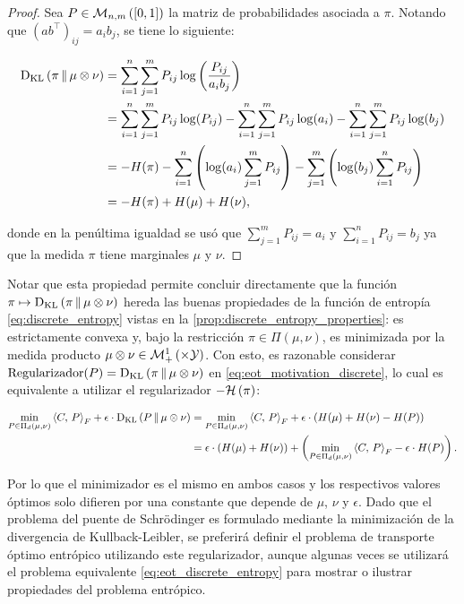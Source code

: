 \begin{proof}
	Sea $P\in\mathcal{M}_{n,m}\left([0,1]\right)$ la matriz de probabilidades asociada a $\pi$. Notando que $(ab^\top)_{ij} = a_i b_j$, se tiene lo siguiente:

	\begin{align*}
		\operatorname{D_{KL}}\left(\pi\,\|\,\mu\otimes\nu\right) & = \sum_{i=1}^n \sum_{j=1}^m P_{ij}\log\left(\frac{P_{ij}}{a_ib_j}\right)                                                                    \\
		                        & = \sum_{i=1}^n \sum_{j=1}^m P_{ij}\log(P_{ij}) - \sum_{i=1}^n \sum_{j=1}^m P_{ij}\log(a_i) - \sum_{i=1}^n \sum_{j=1}^m P_{ij} \log(b_j) \\
		                        & = -H(\pi) - \sum_{i=1}^n \left(\log(a_i)\sum_{j=1}^m P_{ij}\right) - \sum_{j=1}^m \left(\log(b_j) \sum_{i=1}^n P_{ij}\right)                    \\
		                        & = -H(\pi) + H(\mu) + H(\nu),
	\end{align*}

	donde en la penúltima igualdad se usó que $\sum_{j=1}^m P_{ij} = a_i$ y $\sum_{i=1}^n P_{ij} = b_j$ ya que la medida $\pi$ tiene marginales $\mu$ y $\nu$.
\end{proof}

Notar que esta propiedad permite concluir directamente que la función $\pi\mapsto\operatorname{D_{KL}}\left(\pi\,\|\,\mu\otimes\nu\right)$ hereda las buenas propiedades de la función de entropía \eqref{eq:discrete_entropy} vistas en la \autoref{prop:discrete_entropy_properties}: es estrictamente convexa y, bajo la restricción $\pi\in\Pi(\mu,\nu)$, es minimizada por la medida producto $\mu\otimes\nu\in\probmeasure{\xspace\times\yspace}$. Con esto, es razonable considerar $\text{Regularizador}(P)=\operatorname{D_{KL}}\left(\pi\,\|\,\mu\otimes\nu\right)$ en \eqref{eq:eot_motivation_discrete}, lo cual es equivalente a utilizar el regularizador $-\mathcal{H}\left(\pi\right)$:

\begin{align*}
	\min_{P\in\Pi_d(\mu,\nu)} \left\langle C,\,P\right\rangle_F + \epsilon \cdot\operatorname{D_{KL}}\left(P\,\|\,\mu\otimes\nu\right)
	 & = \min_{P\in\Pi_d(\mu,\nu)}  \left\langle C,\,P\right\rangle_F + \epsilon\cdot\left(H(\mu) + H(\nu) - H(P)\right)                              \\
	 & = \epsilon\cdot\left(H(\mu) + H(\nu)\right)+ \left(\min_{P\in\Pi_d(\mu,\nu)}  \left\langle C,\,P\right\rangle_F - \epsilon\cdot H(P)\right).
\end{align*}

Por lo que el minimizador es el mismo en ambos casos y los respectivos valores óptimos solo difieren por una constante que depende de $\mu$, $\nu$ y $\epsilon$. Dado que el problema del puente de Schrödinger es formulado mediante la minimización de la divergencia de Kullback-Leibler, se preferirá definir el problema de transporte óptimo entrópico utilizando este regularizador, aunque algunas veces se utilizará el problema equivalente \eqref{eq:eot_discrete_entropy} para mostrar o ilustrar propiedades del problema entrópico.


